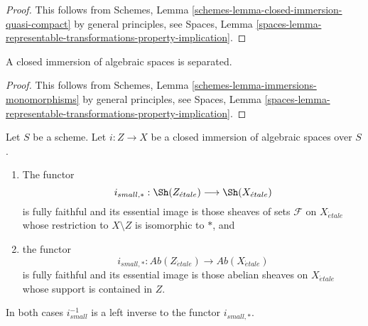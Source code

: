 \begin{proof}
This follows from
Schemes, Lemma \ref{schemes-lemma-closed-immersion-quasi-compact}
by general principles, see
Spaces, Lemma
\ref{spaces-lemma-representable-transformations-property-implication}.
\end{proof}

\begin{lemma}
\label{lemma-closed-immersion-separated}
A closed immersion of algebraic spaces is separated.
\end{lemma}

\begin{proof}
This follows from
Schemes, Lemma \ref{schemes-lemma-immersions-monomorphisms}
by general principles, see
Spaces, Lemma
\ref{spaces-lemma-representable-transformations-property-implication}.
\end{proof}

\begin{lemma}
\label{lemma-closed-immersion-push-pull}
Let $S$ be a scheme. Let $i : Z \to X$ be a closed immersion of algebraic
spaces over $S$.
\begin{enumerate}
\item The functor
$$
i_{small, *} :
\Sh(Z_{\acute{e}tale})
\longrightarrow
\Sh(X_{\acute{e}tale})
$$
is fully faithful and its essential image is those sheaves of sets
$\mathcal{F}$ on $X_{\acute{e}tale}$ whose restriction to $X \setminus Z$ is
isomorphic to $*$, and
\item the functor
$$
i_{small, *} :
\textit{Ab}(Z_{\acute{e}tale})
\longrightarrow
\textit{Ab}(X_{\acute{e}tale})
$$
is fully faithful and its essential image is those abelian sheaves on
$X_{\acute{e}tale}$ whose support is contained in $Z$.
\end{enumerate}
In both cases $i_{small}^{-1}$ is a left inverse to the functor
$i_{small, *}$.
\end{lemma}

